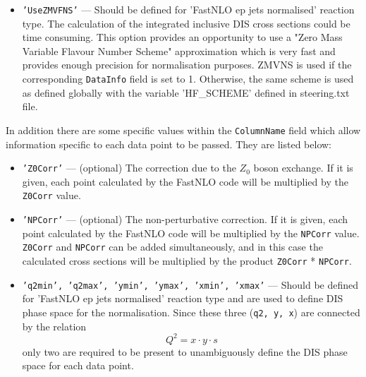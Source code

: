 \begin{description}
\begin{itemize}
   \item {\tt 'UseZMVFNS'} --- Should be defined for 'FastNLO ep jets normalised' reaction type. The calculation
         of the integrated inclusive DIS cross sections could be time consuming.
         This option provides an opportunity to use a "Zero Mass Variable Flavour
         Number Scheme" approximation which is very fast and provides
         enough precision for normalisation purposes. ZMVNS is used if 
         the corresponding {\tt DataInfo} field is set to 1. Otherwise, the same scheme
         is used as defined globally with the variable 'HF\_SCHEME' defined in steering.txt file.
\end{itemize}


In addition there are some specific values within the {\tt ColumnName} field which allow
information specific to each data point to be passed. They are listed below:

\begin{itemize}
     \item{\tt 'Z0Corr'} --- (optional) The correction due to the $Z_0$ boson exchange.
                 If it is given, each point calculated by the FastNLO code will be
                 multiplied by the {\tt Z0Corr} value.

     \item{\tt 'NPCorr'} --- (optional) The non-perturbative correction.
                 If it is given, each point calculated by the FastNLO code will be
                 multiplied by the {\tt NPCorr} value. {\tt Z0Corr} and {\tt NPCorr} can be added 
                 simultaneously, and in this case the calculated cross sections
                 will be multiplied by the product {\tt Z0Corr} * {\tt NPCorr}.

    \item{\tt 'q2min', 'q2max', 'ymin', 'ymax', 'xmin', 'xmax'} --- Should be defined for 
         'FastNLO ep jets normalised' reaction type and are used to define 
         DIS phase space for the normalisation. Since these three ({\tt q2, y, x}) are 
         connected by the relation
         \begin{equation}
              Q^2 = x \cdot y \cdot s
         \end{equation}
         only two are required to be present to unambiguously define the DIS phase space for each data point.
        
\end{itemize}
\end{description}


